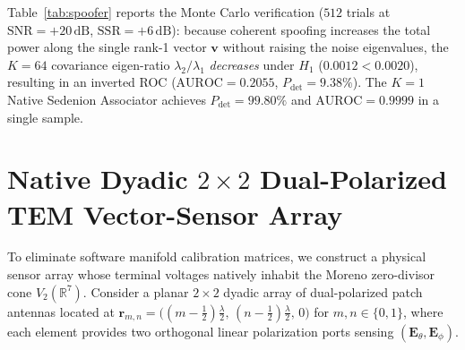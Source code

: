 \documentclass[journal,twoside]{IEEEtran}
\theoremstyle{definition}
\theoremstyle{remark}
\newcommand{\R}{\mathbb{R}}
\begin{document}
Table~\ref{tab:spoofer} reports the Monte Carlo verification ($512$ trials at $\mathrm{SNR} = +20\,\mathrm{dB}$, $\mathrm{SSR} = +6\,\mathrm{dB}$): because coherent spoofing increases the total power along the single rank-1 vector $\bm{v}$ without raising the noise eigenvalues, the $K=64$ covariance eigen-ratio $\lambda_2/\lambda_1$ \emph{decreases} under $H_1$ ($0.0012 < 0.0020$), resulting in an inverted ROC ($\mathrm{AUROC} = 0.2055$, $P_{\mathrm{det}} = 9.38\%$). The $K=1$ Native Sedenion Associator achieves $P_{\mathrm{det}} = 99.80\%$ and $\mathrm{AUROC} = 0.9999$ in a single sample.

\section{Native Dyadic $2\times 2$ Dual-Polarized TEM Vector-Sensor Array}
\label{sec:dyadic}
To eliminate software manifold calibration matrices, we construct a physical sensor array whose terminal voltages natively inhabit the Moreno zero-divisor cone $V_2(\R^7)$. Consider a planar $2\times 2$ dyadic array of dual-polarized patch antennas located at $\bm{r}_{m,n} = \bigl((m-\frac{1}{2})\frac{\lambda}{2},\, (n-\frac{1}{2})\frac{\lambda}{2},\, 0\bigr)$ for $m,n \in \{0,1\}$, where each element provides two orthogonal linear polarization ports sensing $(\bm{E}_\theta, \bm{E}_\phi)$.
\end{document}
